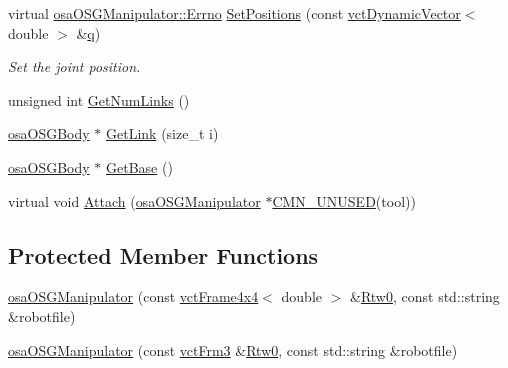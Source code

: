 \begin{DoxyCompactItemize}
virtual \hyperlink{classrob_manipulator_a7bbb51cdb81c9c681075a9274ca0cdc0}{osa\+O\+S\+G\+Manipulator\+::\+Errno} \hyperlink{classosa_o_s_g_manipulator_a06fd405415ed016e703df2d6188d1d5f}{Set\+Positions} (const \hyperlink{classvct_dynamic_vector}{vct\+Dynamic\+Vector}$<$ double $>$ \&\hyperlink{classosa_o_s_g_manipulator_a834ce7263dace4d925133753522abaa3}{q})
\begin{DoxyCompactList}\small\item\em Set the joint position. \end{DoxyCompactList}\item 
unsigned int \hyperlink{classosa_o_s_g_manipulator_a26f4919c6cc78d4d5f0b40e39a258f58}{Get\+Num\+Links} ()
\item 
\hyperlink{classosa_o_s_g_body}{osa\+O\+S\+G\+Body} $\ast$ \hyperlink{classosa_o_s_g_manipulator_a42d5ed24b262a329d94e1fd06e392fda}{Get\+Link} (size\+\_\+t i)
\item 
\hyperlink{classosa_o_s_g_body}{osa\+O\+S\+G\+Body} $\ast$ \hyperlink{classosa_o_s_g_manipulator_a5ec4d3b2d3e9bc70e427171baaa43693}{Get\+Base} ()
\item 
virtual void \hyperlink{classosa_o_s_g_manipulator_a4321ac5ddaabc9bda1ff8f58276dfe95}{Attach} (\hyperlink{classosa_o_s_g_manipulator}{osa\+O\+S\+G\+Manipulator} $\ast$\hyperlink{cmn_portability_8h_a021894e2626935fa2305434b1e893ff6}{C\+M\+N\+\_\+\+U\+N\+U\+S\+E\+D}(tool))
\end{DoxyCompactItemize}
\subsection*{Protected Member Functions}
\begin{DoxyCompactItemize}
\item 
\hyperlink{classosa_o_s_g_manipulator_a29d8d14e5ce28aeba5b06362a83d9399}{osa\+O\+S\+G\+Manipulator} (const \hyperlink{classvct_frame4x4}{vct\+Frame4x4}$<$ double $>$ \&\hyperlink{classrob_manipulator_ab48d9d9a166bf252698bc35788ca6ad6}{Rtw0}, const std\+::string \&robotfile)
\item 
\hyperlink{classosa_o_s_g_manipulator_a4ff428d6fbd1f1e1c8ba8bab8e50e681}{osa\+O\+S\+G\+Manipulator} (const \hyperlink{vct_transformation_types_8h_a81feda0a02c2d1bc26e5553f409fed20}{vct\+Frm3} \&\hyperlink{classrob_manipulator_ab48d9d9a166bf252698bc35788ca6ad6}{Rtw0}, const std\+::string \&robotfile)
\end{DoxyCompactItemize}
